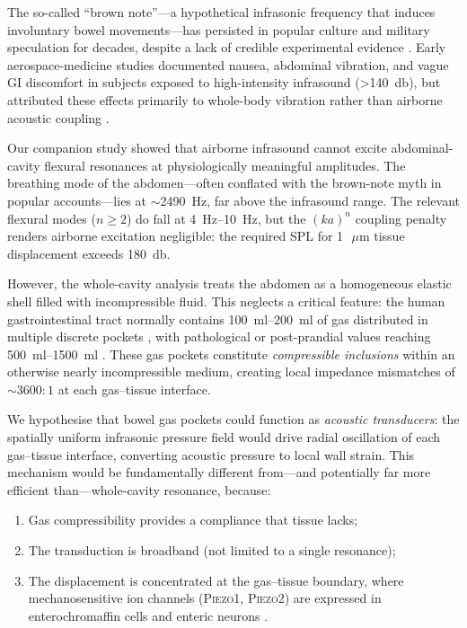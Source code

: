 \documentclass[12pt]{article}
\newcommand{\piezo}{\textsc{Piezo}}
\newcommand{\um}{\ensuremath{\,\mu\text{m}}}
\begin{document}
The so-called ``brown note''---a hypothetical infrasonic frequency that
induces involuntary bowel movements---has persisted in popular culture and
military speculation for decades, despite a lack of credible experimental
evidence \citep{Jauchem2007,Leventhall2007,SouthPark2000BrownNoise,MythBusters2005BrownNote}.  Early aerospace-medicine
studies documented nausea, abdominal vibration, and vague GI discomfort in
subjects exposed to high-intensity infrasound (\SI{>140}{\decibel}), but
attributed these effects primarily to whole-body vibration rather than
airborne acoustic coupling \citep{Mohr1965,vonGierke1974}.

Our companion study \citep{Mace2026browntone} showed that
airborne infrasound cannot excite abdominal-cavity flexural resonances at
physiologically meaningful amplitudes.  The breathing mode of the
abdomen---often conflated with the brown-note myth in popular accounts---lies at
$\sim$\SI{2490}{\hertz}, far above the infrasound range.  The relevant
flexural modes ($n \ge 2$) do fall at \SIrange{4}{10}{\hertz}, but the
$(ka)^n$ coupling penalty renders airborne excitation negligible: the
required SPL for \SI{1}{\um} tissue displacement exceeds
\SI{180}{\decibel}.

However, the whole-cavity analysis treats the abdomen as a homogeneous
elastic shell filled with incompressible fluid.  This neglects a critical
feature: the human gastrointestinal tract normally contains
\SIrange{100}{200}{\milli\litre} of gas distributed in multiple discrete
pockets \citep{Levitt1971,Suarez1997}, with pathological or post-prandial
values reaching \SIrange{500}{1500}{\milli\litre}
\citep{Bedell1956,Serra2001}.  These gas pockets constitute
\emph{compressible inclusions} within an otherwise nearly incompressible
medium, creating local impedance mismatches of $\sim 3600{:}1$ at each
gas--tissue interface.

We hypothesise that bowel gas pockets could function as \emph{acoustic
transducers}: the spatially uniform infrasonic pressure field would drive
radial oscillation of each gas--tissue interface, converting acoustic
pressure to local wall strain.  This mechanism would be fundamentally
different from---and potentially far more efficient than---whole-cavity
resonance, because:
\begin{enumerate}
  \item Gas compressibility provides a compliance that tissue lacks;
  \item The transduction is broadband (not limited to a single resonance);
  \item The displacement is concentrated at the gas--tissue boundary, where
        mechanosensitive ion channels (\piezo1, \piezo2) are expressed in
        enterochromaffin cells and enteric neurons
        \citep{Coste2010,Alcaino2017,Zeitzschel2024}.
\end{enumerate}
\end{document}
